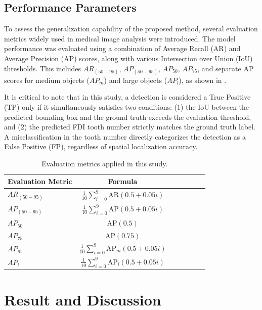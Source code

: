 \documentclass[pdflatex,sn-mathphys-num]{sn-jnl}%
\theoremstyle{thmstyleone}%
\theoremstyle{thmstyletwo}%
\theoremstyle{thmstylethree}%
\begin{document}
\subsection{Performance Parameters}

To assess the generalization capability of the proposed method, several evaluation metrics widely used in medical image analysis were introduced. The model performance was evaluated using a combination of Average Recall (AR) and Average Precision (AP) scores, along with various Intersection over Union (IoU) thresholds. This includes $AR_{(50-95)}$, $AP_{(50-95)}$, $AP_{50}$, $AP_{75}$, and separate AP scores for medium objects ($AP_m$) and large objects ($AP_l$), as shown in .

It is critical to note that in this study, a detection is considered a True Positive (TP) only if it simultaneously satisfies two conditions: (1) the IoU between the predicted bounding box and the ground truth exceeds the evaluation threshold, and (2) the predicted FDI tooth number strictly matches the ground truth label. A misclassification in the tooth number directly categorizes the detection as a False Positive (FP), regardless of spatial localization accuracy.

\begin{table}[h]
    \centering
    \caption{Evaluation metrics applied in this study.}
    \begin{tabular}{lcccccc}
        \hline
        Evaluation Metric & Formula \\
        \hline
        $AR_{(50-95)}$ & \(\frac{1}{10} \sum_{i=0}^{9} \text{AR}(0.5 + 0.05i)\) \\
        $AP_{(50-95)}$ & \(\frac{1}{10} \sum_{i=0}^{9} \text{AP}(0.5 + 0.05i)\) \\
        $AP_{50}$ & \(\text{AP}(0.5)\) \\
        $AP_{75}$ & \(\text{AP}(0.75)\) \\
        $AP_m$ & \(\frac{1}{10} \sum_{i=0}^{9} \text{AP}_m(0.5 + 0.05i)\) \\
        $AP_l$ & \(\frac{1}{10} \sum_{i=0}^{9} \text{AP}_l(0.5 + 0.05i)\) \\
        \hline
    \end{tabular}%
    \label{tab:evaluation_metrics}
\end{table}

\section{Result and Discussion}
\end{document}
